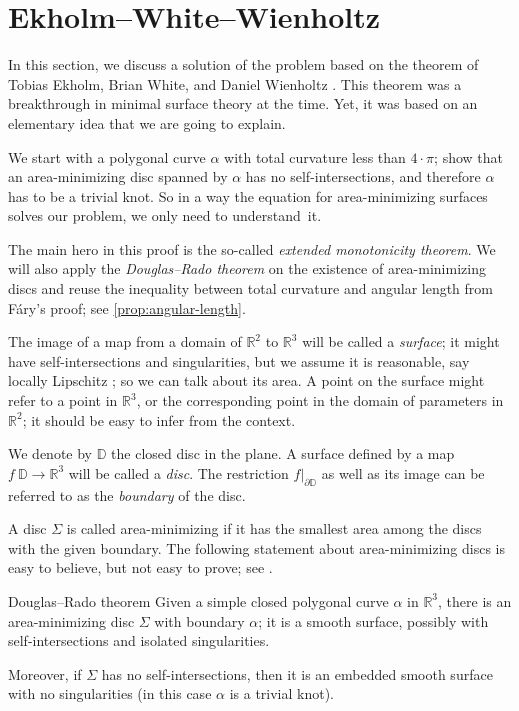 \section{Ekholm--White--Wienholtz}

In this section, we discuss a solution of the problem based on the theorem of Tobias Ekholm, Brian White, and Daniel Wienholtz \cite{EWW_embed}.
This theorem was a breakthrough in minimal surface theory at the time.
Yet, it was based on an elementary idea that we are going to explain.

We start with a polygonal curve $\alpha$ with total curvature less than $4\cdot\pi$;
show that an area-minimizing disc spanned by $\alpha$ has no self-intersections, and therefore $\alpha$ has to be a trivial knot.
So in a way the equation for area-minimizing surfaces solves our problem, we only need to understand~it.

The main hero in this proof is the so-called \emph{extended monotonicity theorem}.
We will also apply the \emph{Douglas--Rado theorem} on the existence of area-minimizing discs and reuse the inequality between total curvature and angular length from Fáry's proof; see \ref{prop:angular-length}.

The image of a map from a domain of $\mathbb{R}^2$ to $\mathbb{R}^3$ will be called a \emph{surface};
it might have self-intersections and singularities, but we assume it is reasonable, say locally Lipschitz \cite{wiki:lipschitz}; so we can talk about its area.
A point on the surface might refer to a point in $\mathbb{R}^3$, or the corresponding point in the domain of parameters in $\mathbb{R}^2$;
it should be easy to infer from the context.

We denote by $\mathbb{D}$ the closed disc in the plane.
A surface defined by a map $f\:\mathbb{D}\to\mathbb{R}^3$ will be called a \emph{disc}.
The restriction $f|_{\partial \mathbb{D}}$ as well as its image can be referred to as the \emph{boundary} of the disc.

A disc $\Sigma$ is called area-minimizing if it has the smallest area among the discs with the given boundary.
The following statement about area-minimizing discs is easy to believe, but not easy to prove; see \cite{white-lectures}.

\begin{thm}{Douglas--Rado theorem}\label{thm:min-exists}
Given a simple closed polygonal curve $\alpha$ in $\mathbb{R}^3$, there is an area-minimizing disc $\Sigma$ with boundary $\alpha$; it is a smooth surface, possibly with self-intersections and isolated singularities.

Moreover, if $\Sigma$ has no self-intersections, then it is an embedded smooth surface with no singularities (in this case $\alpha$ is a trivial knot).
\end{thm}

